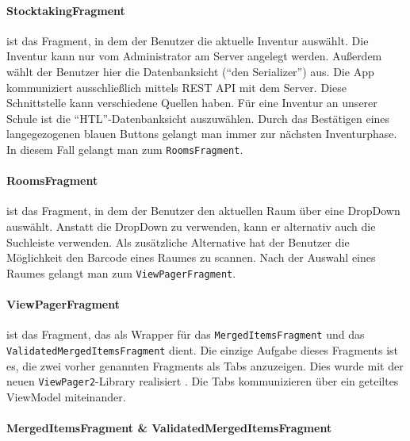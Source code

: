 \hypertarget{stocktakingfragment}{%
\paragraph{StocktakingFragment}\label{stocktakingfragment}}

ist das Fragment, in dem der Benutzer die aktuelle Inventur auswählt.
Die Inventur kann nur vom Administrator am Server angelegt werden.
Außerdem wählt der Benutzer hier die Datenbanksicht (``den Serializer'')
aus. Die App kommuniziert ausschließlich mittels REST API mit dem
Server. Diese Schnittstelle kann verschiedene Quellen haben. Für eine
Inventur an unserer Schule ist die ``HTL''-Datenbanksicht auszuwählen.
Durch das Bestätigen eines langegezogenen blauen Buttons gelangt man
immer zur nächsten Inventurphase. In diesem Fall gelangt man zum
\texttt{RoomsFragment}.

\hypertarget{roomsfragment}{%
\paragraph{RoomsFragment}\label{roomsfragment}}

ist das Fragment, in dem der Benutzer den aktuellen Raum über eine
DropDown auswählt. Anstatt die DropDown zu verwenden, kann er alternativ
auch die Suchleiste verwenden. Als zusätzliche Alternative hat der
Benutzer die Möglichkeit den Barcode eines Raumes zu scannen. Nach der
Auswahl eines Raumes gelangt man zum \texttt{ViewPagerFragment}.

\hypertarget{viewpagerfragment}{%
\paragraph{ViewPagerFragment}\label{viewpagerfragment}}

ist das Fragment, das als Wrapper für das \texttt{MergedItemsFragment}
und das \texttt{ValidatedMergedItemsFragment} dient. Die einzige Aufgabe
dieses Fragments ist es, die zwei vorher genannten Fragments als Tabs
anzuzeigen. Dies wurde mit der neuen \texttt{ViewPager2}-Library
realisiert \cite{viewpager2}. Die Tabs kommunizieren über ein geteiltes
ViewModel miteinander.

\hypertarget{mergeditemsfragment-validatedmergeditemsfragment}{%
\paragraph{MergedItemsFragment \&
ValidatedMergedItemsFragment}\label{mergeditemsfragment-validatedmergeditemsfragment}}

